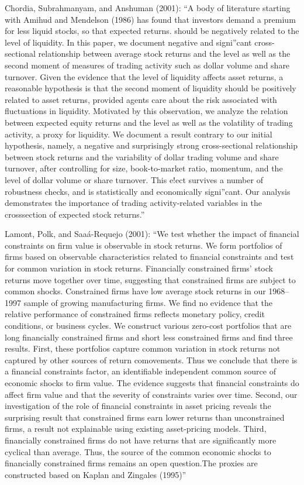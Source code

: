 \documentclass[
  letterpaper,
  DIV=11,
  numbers=noendperiod]{scrreprt}
\begin{document}
Chordia, Subrahmanyam, and Anshuman (2001): ``A body of literature
starting with Amihud and Mendelson (1986) has found that investors
demand a premium for less liquid stocks, so that expected returns.
should be negatively related to the level of liquidity. In this paper,
we document negative and signi''cant cross-sectional relationship
between average stock returns and the level as well as the second moment
of measures of trading activity such as dollar volume and share
turnover. Given the evidence that the level of liquidity affects asset
returns, a reasonable hypothesis is that the second moment of liquidity
should be positively related to asset returns, provided agents care
about the risk associated with fluctuations in liquidity. Motivated by
this observation, we analyze the relation between expected equity
returns and the level as well as the volatility of trading activity, a
proxy for liquidity. We document a result contrary to our initial
hypothesis, namely, a negative and surprisingly strong cross-sectional
relationship between stock returns and the variability of dollar trading
volume and share turnover, after controlling for size, book-to-market
ratio, momentum, and the level of dollar volume or share turnover. This
e!ect survives a number of robustness checks, and is statistically and
economically signi''cant. Our analysis demonstrates the importance of
trading activity-related variables in the crosssection of expected stock
returns.''

Lamont, Polk, and Saaá-Requejo (2001): ``We test whether the impact of
financial constraints on firm value is observable in stock returns. We
form portfolios of firms based on observable characteristics related to
financial constraints and test for common variation in stock returns.
Financially constrained firms' stock returns move together over time,
suggesting that constrained firms are subject to common shocks.
Constrained firms have low average stock returns in our 1968--1997
sample of growing manufacturing firms. We find no evidence that the
relative performance of constrained firms reflects monetary policy,
credit conditions, or business cycles. We construct various zero-cost
portfolios that are long financially constrained firms and short less
constrained firms and find three results. First, these portfolios
capture common variation in stock returns not captured by other sources
of return comovements. Thus we conclude that there is a financial
constraints factor, an identifiable independent common source of
economic shocks to firm value. The evidence suggests that financial
constraints do affect firm value and that the severity of constraints
varies over time. Second, our investigation of the role of financial
constraints in asset pricing reveals the surprising result that
constrained firms earn lower returns than unconstrained firms, a result
not explainable using existing asset-pricing models. Third, financially
constrained firms do not have returns that are significantly more
cyclical than average. Thus, the source of the common economic shocks to
financially constrained firms remains an open question.The proxies are
constructed based on Kaplan and Zingales (1995)''
\end{document}
